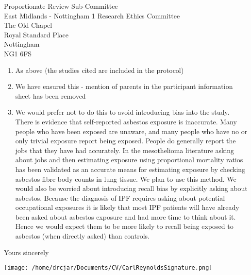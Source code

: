 \documentclass[imperial,letterpaper,pagesize,UScommercial9]{scrlttr2}
\begin{document}
\begin{letter}{    
    Proportionate Review Sub-Committee \\        
    East Midlands - Nottingham 1 Research Ethics Committee \\
    The Old Chapel \\
    Royal Standard Place \\
    Nottingham \\
    NG1 6FS}
\begin{enumerate}[]
        \item As above (the studies cited are included in the protocol)
        \item We have ensured this - mention of parents in the participant information sheet has been removed
        \item We would prefer not to do this to avoid introducing bias into the study. There is evidence that self-reported asbestos exposure is inaccurate. Many people who have been exposed are unaware, and many people who have no or only trivial exposure report being exposed. People do generally report the jobs that they have had accurately. In the mesothelioma literature asking about jobs and then estimating exposure using proportional mortality ratios has been validated as an accurate means
            for estimating exposure by checking asbestos fibre body counts in lung tissue. We plan to use this method. We would also be worried about introducing recall bias by explicitly asking about asbestos. Because the diagnosis of IPF requires asking about potential occupational exposures it is likely that most IPF patients will have already been asked about asbestos exposure and had more time to think about it. Hence we would expect them to be more likely to recall being exposed to asbestos (when directly asked) than controls.
    \end{enumerate}


\closing{Yours sincerely}

    \texttt{[image: /home/drcjar/Documents/CV/CarlReynoldsSignature.png]}

\end{letter}
\end{document}
